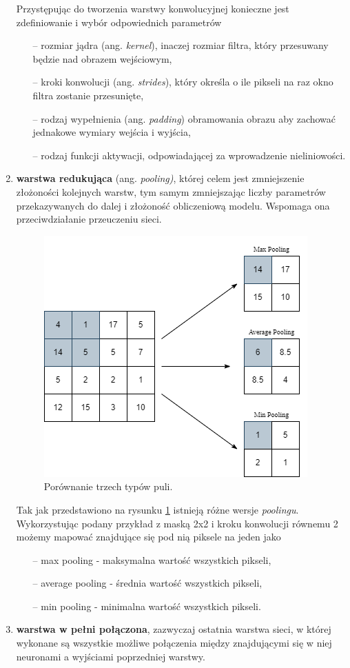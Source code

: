 \begin{enumerate}
        Przystępując do tworzenia warstwy konwolucyjnej konieczne jest zdefiniowanie i wybór odpowiednich parametrów 
    \begin{itemize}
        \item[--] rozmiar jądra (ang. \textit{kernel}), inaczej rozmiar filtra, który przesuwany będzie nad obrazem wejściowym,
        \item[--] kroki konwolucji (ang. \textit{strides}), który określa o ile pikseli na raz okno filtra zostanie przesunięte,
        \item[--] rodzaj wypełnienia (ang. \textit{padding}) obramowania obrazu aby zachować jednakowe wymiary wejścia i wyjścia,
        \item[--] rodzaj funkcji aktywacji, odpowiadającej za wprowadzenie nieliniowości.
    \end{itemize}
    
    
    \item \textbf{warstwa redukująca} (ang. \textit{pooling)}, której celem jest zmniejszenie złożoności kolejnych warstw, tym samym zmniejszając liczby parametrów przekazywanych do dalej i złożoność obliczeniową modelu. Wspomaga ona przeciwdziałanie przeuczeniu sieci.
        \begin{figure}[H]
            \centering
            \includegraphics[width=0.5\linewidth]{Obrazy/Rozdzial02/pooling.png}
            \caption{Porównanie trzech typów puli.}
            \label{fig:pooling}
        \end{figure}

        Tak jak przedstawiono na rysunku \ref{fig:pooling} istnieją różne wersje \textit{poolingu}. Wykorzystując podany przykład z maską 2x2 i kroku konwolucji równemu 2 możemy mapować znajdujące się pod nią piksele na jeden jako
        \begin{itemize}
            \item[--] max pooling -  maksymalna wartość wszystkich pikseli,
            \item[--] average pooling - średnia wartość wszystkich pikseli,
            \item[--] min pooling - minimalna wartość wszystkich pikseli.
        \end{itemize}
        
    \item \textbf{warstwa w pełni połączona}, zazwyczaj ostatnia warstwa sieci, w której wykonane są wszystkie możliwe połączenia między znajdującymi się w niej neuronami a wyjściami poprzedniej warstwy. 
\end{enumerate}


